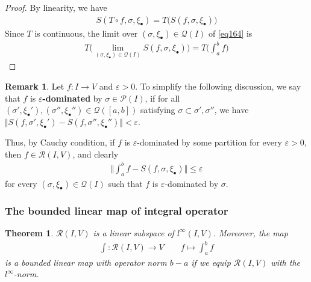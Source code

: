 \documentclass[12pt,b5paper,notitlepage]{article}
\theoremstyle{definition}
\newtheorem{rem}[df]{Remark}
\theoremstyle{plain}
\newtheorem{thm}[df]{Theorem}
\newcommand{\mc}{\mathcal}
\newcommand{\scr}{\mathscr}
\newcommand{\blt}{\bullet}
\newcommand{\eps}{\varepsilon}
\numberwithin{equation}{section}
\begin{document}
\begin{proof}
By linearity, we have
\begin{align}
S(T\circ f,\sigma,\xi_\blt)=T\big(S(f,\sigma,\xi_\blt) \big)  \label{eq164}
\end{align}
Since $T$ is continuous, the limit over $(\sigma,\xi_\blt) \in \mc Q(I)$ of \eqref{eq164} is
\begin{align*}
T\Big(\lim_{(\sigma,\xi_\blt)\in\mc Q(I)}S(f,\sigma,\xi_\blt)\Big)=T\Big(\int_a^b f \Big)
\end{align*}
\end{proof}




\begin{rem}\label{lb374}
Let $f:I\rightarrow V$ and $\eps>0$. To simplify the following discussion, we say that $f$ is \textbf{$\eps$-dominated} \index{zz@$\eps$-dominated} by $\sigma\in\mc P(I)$, if for all $(\sigma',\xi_\blt'),(\sigma'',\xi_\blt'')\in\mc Q([a,b])$ satisfying $\sigma\subset\sigma',\sigma''$, we have $\Vert S(f,\sigma',\xi_\blt')-S(f,\sigma'',\xi_\blt'')\Vert<\eps$. 

Thus, by Cauchy condition, if $f$ is $\eps$-dominated by some partition for every $\eps>0$, then $f\in\scr R(I,V)$, and clearly
\begin{align}
\Big\Vert \int_a^b f-S(f,\sigma,\xi_\blt) \Big\Vert\leq\eps
\end{align}
for every $(\sigma,\xi_\blt)\in\mc Q(I)$ such that $f$ is $\eps$-dominated by $\sigma$. \hfill\qedsymbol
\end{rem}





\subsubsection{The bounded linear map of integral operator}


\begin{thm}\label{lb375}
$\scr R(I,V)$ is a linear subspace of $l^\infty(I,V)$. Moreover,  the map
\begin{align}
\int: \scr R(I,V)\rightarrow V\qquad f\mapsto\int_a^b f \label{eq159}
\end{align}
is a bounded linear map with operator norm $b-a$ if we equip $\scr R(I,V)$ with the $l^\infty$-norm.
\end{thm}
\end{document}
